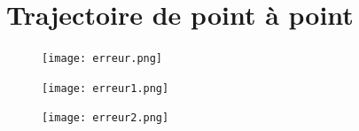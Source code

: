 \documentclass[12pt]{beamer}
\begin{document}
	\section{Trajectoire de point à point}
	\begin{frame}
    	    \begin{figure}
			    \centering
			    \texttt{[image: erreur.png]}
			\end{figure}
	\end{frame}
	\begin{frame}
    	    \begin{figure}
			    \centering
			    \texttt{[image: erreur1.png]}
			\end{figure}
	\end{frame}
	\begin{frame}
    	    \begin{figure}
			    \centering
			    \texttt{[image: erreur2.png]}
			\end{figure}
	\end{frame}
\end{document}
